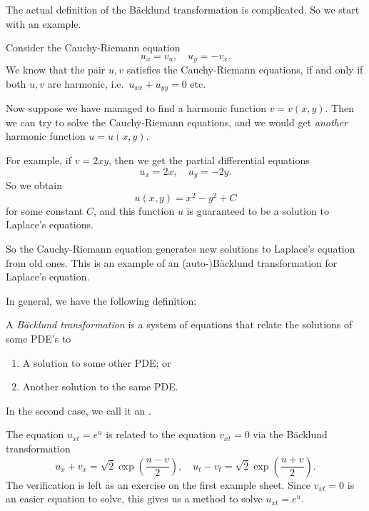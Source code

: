\documentclass[a4paper]{article}
\begin{document}
The actual definition of the B\"acklund transformation is complicated. So we start with an example.
\begin{eg}
  Consider the Cauchy-Riemann equation
  \[
    u_x = v_u,\quad u_y = -v_x.
  \]
  We know that the pair $u, v$ satisfies the Cauchy-Riemann equations, if and only if both $u, v$ are harmonic, i.e.\ $u_{xx} + u_{yy} = 0$ etc.

  Now suppose we have managed to find a harmonic function $v = v(x, y)$. Then we can try to solve the Cauchy-Riemann equations, and we would get \emph{another} harmonic function $u = u(x, y)$.

  For example, if $v = 2xy$, then we get the partial differential equations
  \[
    u_x = 2x,\quad u_y = -2y.
  \]
  So we obtain
  \[
    u(x, y) = x^2 - y^2 + C
  \]
  for some constant $C$, and this function $u$ is guaranteed to be a solution to Laplace's equations.

  So the Cauchy-Riemann equation generates new solutions to Laplace's equation from old ones. This is an example of an (auto-)B\"acklund transformation for Laplace's equation.
\end{eg}

In general, we have the following definition:
\begin{defi}
  A \emph{B\"acklund transformation} is a system of equations that relate the solutions of some PDE's to
  \begin{enumerate}
    \item A solution to some other PDE; or
    \item Another solution to the same PDE.
  \end{enumerate}
  In the second case, we call it an .
\end{defi}

\begin{eg}
  The equation $u_{xt} = e^u$ is related to the equation $v_{xt} = 0$ via the B\"acklund transformation
  \[
    u_x + v_x = \sqrt{2} \exp \left(\frac{u - v}{2}\right),\quad u_t - v_t = \sqrt{2} \exp\left(\frac{u + v}{2}\right).
  \]
  The verification is left as an exercise on the first example sheet. Since $v_{xt} = 0$ is an easier equation to solve, this gives us a method to solve $u_{xt} = e^u$.
\end{eg}
\end{document}
